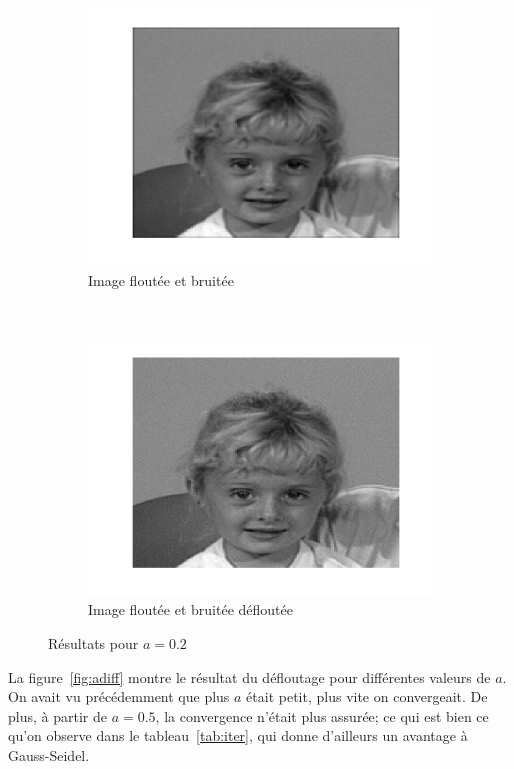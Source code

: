 \begin{figure}
\begin{subfigure}[b]{0.45\textwidth}
    \includegraphics[width=\textwidth]{Q2/noise_20.png}
    \caption{Image floutée et bruitée}
    \label{fig:a2noise}
  \end{subfigure}%
  ~
  \begin{subfigure}[b]{0.45\textwidth}
    \includegraphics[width=\textwidth]{Q2/unblurred_20.png}
    \caption{Image floutée et bruitée défloutée}
    \label{fig:a2unblurred}
  \end{subfigure}
  \caption{Résultats pour $a = 0.2$}\label{fig:a2}
\end{figure}

La figure~\ref{fig:adiff} montre le résultat du défloutage pour différentes valeurs de $a$.
On avait vu précédemment que plus $a$ était petit, plus vite on convergeait. De plus, à partir de $a = 0.5$, la convergence n'était plus assurée; ce qui est bien ce qu'on observe dans le tableau~\ref{tab:iter}, qui donne d'ailleurs un avantage
à Gauss-Seidel. 

